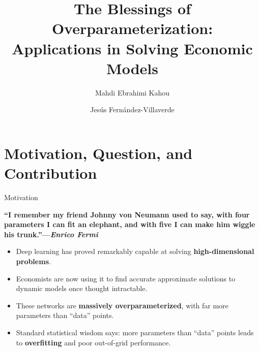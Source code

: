 \documentclass[aspectratio=169,10pt]{beamer}
\newcommand{\emphcolor}[1]{\textbf{\textcolor{emphcolorval}{#1}}}
\begin{document}
\title{{\vspace{0.4in}\hspace{0.2in}\textcolor{KahouBlack}{The Blessings of Overparameterization: \\ \hspace*{5mm}Applications in Solving Economic Models}}}
\author{\hspace*{4mm} Mahdi Ebrahimi Kahou \and
	Jes\'{u}s Fern\'{a}ndez-Villaverde}


\date{}

\maketitle

\section{\textcolor{KahouBlack}{Motivation, Question, and Contribution}}

\begin{frame}{Motivation}
	\begin{center}
		\emphcolor{``I remember my friend Johnny von Neumann used to say, with four parameters I can fit an elephant, and with five I can make him wiggle his trunk.''---{\it Enrico Fermi}}
		\vspace{0.1in}
	\end{center}
	\vspace{0.1in}
	\begin{itemize}
		\item Deep learning has proved remarkably capable at solving \emphcolor{high-dimensional problems}.
		\vspace{0.1in}
		\item Economists are now using it to find accurate approximate solutions to dynamic models once thought intractable.
		\vspace{0.1in}
		\item These networks are \emphcolor{massively overparameterized}, with far more parameters than ``data'' points.
		\vspace{0.1in}
		\item Standard statistical wisdom says: more parameters than ``data'' points leads to \emphcolor{overfitting} and poor out-of-grid performance.
	\end{itemize}
\end{frame}
\end{document}
